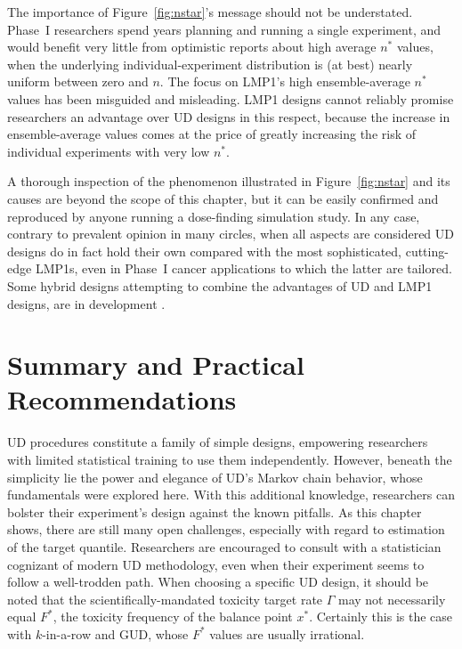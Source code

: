 The importance of Figure~\ref{fig:nstar}'s message  should not be understated.  Phase~I researchers spend years planning and running a single experiment, and would benefit very little from optimistic reports about high average $n^*$ values, when the underlying individual-experiment distribution is (at best) nearly uniform between zero and $n$. The focus on LMP1's high ensemble-average $n^*$ values has been misguided and misleading. LMP1 designs cannot reliably promise researchers an advantage over UD designs in this respect, because the increase in ensemble-average values comes at the price of greatly increasing the risk of individual experiments with very low $n^*$.

A thorough inspection of the phenomenon illustrated in Figure~\ref{fig:nstar} and its causes are beyond the scope of this chapter, but it can be easily confirmed and reproduced by anyone running a dose-finding simulation study. In any case, contrary to prevalent opinion in many circles, when all aspects are considered UD designs do in fact hold their own compared with the most sophisticated, cutting-edge LMP1s, even in  Phase~I cancer applications to which the latter are tailored. Some hybrid designs attempting to combine the advantages of UD and LMP1 designs, are in development \citep[Ch.~5]{Oron07}.


\section{Summary and Practical Recommendations}\label{sec:summary}

UD procedures constitute a family of simple designs, empowering researchers with limited statistical training to use them independently. However, beneath the simplicity lie the power and elegance of UD's Markov chain behavior, whose fundamentals were explored here. With this additional knowledge, researchers can bolster their experiment's design against the known pitfalls. As this chapter shows, there are still many open challenges, especially with regard to estimation of the target quantile. Researchers are encouraged to consult with a statistician cognizant of modern UD methodology, even when their experiment seems to follow a well-trodden path. When choosing a specific UD design, it should be noted that the scientifically-mandated toxicity target rate $\Gamma$ may not necessarily equal $F^*$, the toxicity frequency of the balance point $x^*$. Certainly this is the case with $k$-in-a-row and GUD, whose $F^*$ values are usually irrational.

